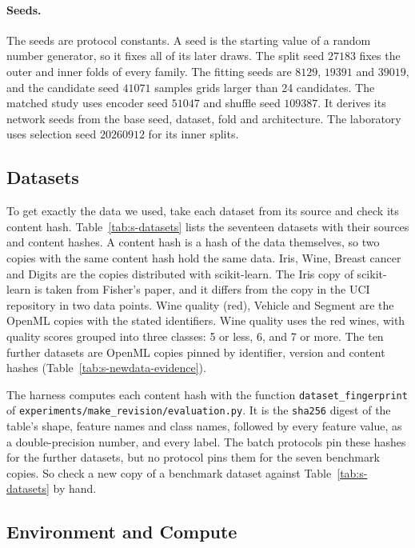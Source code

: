 \paragraph{Seeds.} The seeds are protocol constants. A seed is the starting value of a random number generator, so it fixes all of its later draws. The split seed $27183$ fixes the outer and inner folds of every family. The fitting seeds are $8129$, $19391$ and $39019$, and the candidate seed $41071$ samples grids larger than 24 candidates. The matched study uses encoder seed $51047$ and shuffle seed $109387$. It derives its network seeds from the base seed, dataset, fold and architecture. The laboratory uses selection seed $20260912$ for its inner splits.

\FloatBarrier
\subsection{Datasets}\label{supp:datasets}

To get exactly the data we used, take each dataset from its source and check its content hash. Table~\ref{tab:s-datasets} lists the seventeen datasets with their sources and content hashes. A content hash is a hash of the data themselves, so two copies with the same content hash hold the same data. Iris, Wine, Breast cancer and Digits are the copies distributed with scikit-learn. The Iris copy of scikit-learn is taken from Fisher's paper, and it differs from the copy in the UCI repository in two data points. Wine quality (red), Vehicle and Segment are the OpenML copies with the stated identifiers. Wine quality uses the red wines, with quality scores grouped into three classes: 5 or less, 6, and 7 or more. The ten further datasets are OpenML copies pinned by identifier, version and content hashes (Table~\ref{tab:s-newdata-evidence}).

The harness computes each content hash with the function \texttt{dataset\_fingerprint} of \texttt{experiments/make\_revision/evaluation.py}. It is the \texttt{sha256} digest of the table's shape, feature names and class names, followed by every feature value, as a double-precision number, and every label. The batch protocols pin these hashes for the further datasets, but no protocol pins them for the seven benchmark copies. So check a new copy of a benchmark dataset against Table~\ref{tab:s-datasets} by hand.



\FloatBarrier
\subsection{Environment and Compute}\label{supp:environment}

